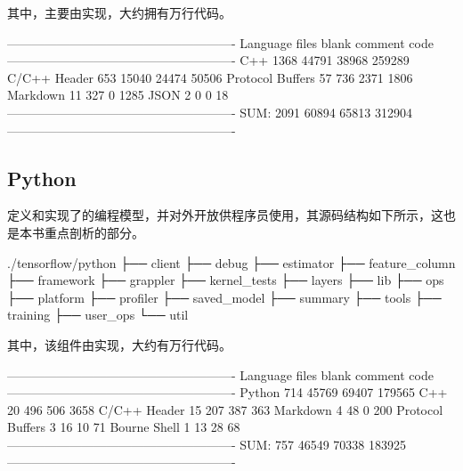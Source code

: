 \begin{content}
其中，主要由实现，大约拥有万行代码。

\begin{leftbar}
\begin{python}[caption={Core代码统计}]
-------------------------------------------------------
Language             files    blank   comment      code
-------------------------------------------------------
C++                   1368    44791     38968    259289
C/C++ Header           653    15040     24474     50506
Protocol Buffers        57      736      2371      1806
Markdown                11      327         0      1285
JSON                     2        0         0        18
-------------------------------------------------------
SUM:                  2091    60894     65813    312904
-------------------------------------------------------
\end{python}
\end{leftbar}

\subsection{Python}

定义和实现了\tf{}的编程模型，并对外开放供程序员使用，其源码结构如下所示，这也是本书重点剖析的部分。

\begin{leftbar}
\begin{c++}[caption={Python源码结构}]
./tensorflow/python
├── client
├── debug
├── estimator
├── feature_column
├── framework
├── grappler
├── kernel_tests
├── layers
├── lib
├── ops
├── platform
├── profiler
├── saved_model
├── summary
├── tools
├── training
├── user_ops
└── util
\end{c++}
\end{leftbar}

其中，该组件由实现，大约有万行代码。

\begin{leftbar}
\begin{python}[caption={Python代码统计}]
-------------------------------------------------------
Language            files     blank   comment      code
-------------------------------------------------------
Python                714     45769     69407    179565
C++                    20       496       506      3658
C/C++ Header           15       207       387       363
Markdown                4        48         0       200
Protocol Buffers        3        16        10        71
Bourne Shell            1        13        28        68
-------------------------------------------------------
SUM:                  757     46549     70338    183925
-------------------------------------------------------
\end{python}
\end{leftbar}


\end{content}
